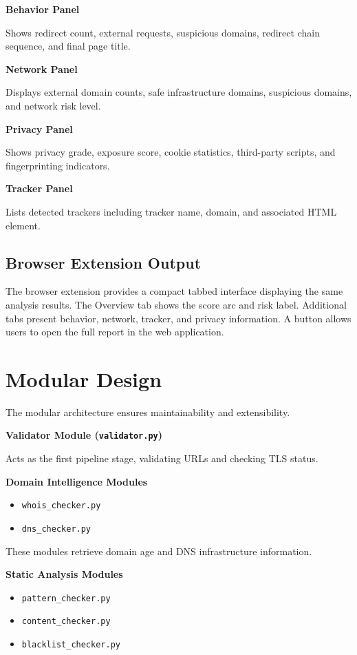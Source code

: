 \textbf{Behavior Panel}

Shows redirect count, external requests, suspicious domains, redirect chain sequence, and final page title.

\textbf{Network Panel}

Displays external domain counts, safe infrastructure domains, suspicious domains, and network risk level.

\textbf{Privacy Panel}

Shows privacy grade, exposure score, cookie statistics, third-party scripts, and fingerprinting indicators.

\textbf{Tracker Panel}

Lists detected trackers including tracker name, domain, and associated HTML element.

\subsection{Browser Extension Output}

The browser extension provides a compact tabbed interface displaying the same analysis results. The Overview tab shows the score arc and risk label. Additional tabs present behavior, network, tracker, and privacy information. A button allows users to open the full report in the web application.

\section{Modular Design}

The modular architecture ensures maintainability and extensibility.

\textbf{Validator Module (\texttt{validator.py})}

Acts as the first pipeline stage, validating URLs and checking TLS status.

\textbf{Domain Intelligence Modules}

\begin{itemize}
\item \texttt{whois\_checker.py}
\item \texttt{dns\_checker.py}
\end{itemize}

These modules retrieve domain age and DNS infrastructure information.

\textbf{Static Analysis Modules}

\begin{itemize}
\item \texttt{pattern\_checker.py}
\item \texttt{content\_checker.py}
\item \texttt{blacklist\_checker.py}
\end{itemize}

